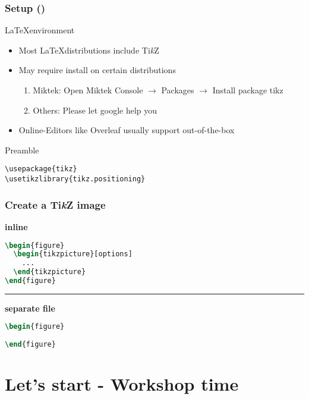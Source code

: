 \documentclass{beamer}
\newcommand{\tikzname}{Ti\textit{k}Z\xspace}
\begin{document}
\begin{frame}[fragile]
\frametitle{Setup ()}
\begin{block}{\LaTeX environment}
    \begin{itemize}
        \item Most \LaTeX distributions include \tikzname
        \item May require install on certain distributions
        \begin{enumerate}
            \item Miktek: Open Miktek Console \(\rightarrow\) Packages \(\rightarrow\) Install package tikz
            \item Others: Please let google help you
        \end{enumerate}
        \item Online-Editors like Overleaf usually support out-of-the-box
    \end{itemize}
\end{block}

\begin{block}{Preamble}
\begin{verbatim}
\usepackage{tikz}
\usetikzlibrary{tikz.positioning}
\end{verbatim}
\end{block}

\end{frame}


\begin{frame}[fragile]
\frametitle{Create a \tikzname image}
%
\textbf{inline}
\begin{lstlisting}[language=TeX]
\begin{figure}
  \begin{tikzpicture}[options]
    ...
  \end{tikzpicture}
\end{figure}
\end{lstlisting}
\hrule
\vspace{1em}
\textbf{separate file}
\begin{lstlisting}[language={TeX}]
\begin{figure}
  
\end{figure}
\end{lstlisting}
\end{frame}
%
\section{Let's start - Workshop time}
\end{document}

